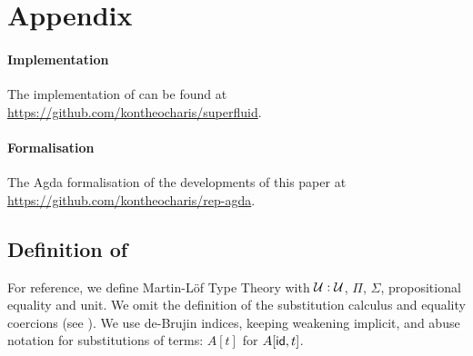 \clearpage
\section{Appendix}

\allowdisplaybreaks

\paragraph{Implementation}

The implementation of \superfluid can be found at \url{https://github.com/kontheocharis/superfluid}.

\paragraph{Formalisation} \label{app:formalisation}

The Agda formalisation of the developments of this paper at \url{https://github.com/kontheocharis/rep-agda}.

\subsection{Definition of \lambdamltt}

For reference, we define Martin-Löf Type Theory with $\mathcal{U} :
\mathcal{U}$, $\Pi$, $\Sigma$, propositional equality and unit. We omit the
definition of the substitution calculus and equality coercions
(see \cite[5.1.2]{Castellan2019-qo}). We use de-Brujin indices, keeping weakening
implicit, and abuse notation for substitutions of terms: $A[t]$ for $A[\textsf{id},
t]$.

\newcommand{\refl}{\mta{refl}}
\newcommand{\fst}{\mta{fst}}
\newcommand{\snd}{\mta{snd}}
\newcommand{\pair}{\mta{pair}}
\newcommand{\app}{\mta{app}}
\newcommand{\lam}{\mta{lam}}
\newcommand{\J}{\mta{J}}



